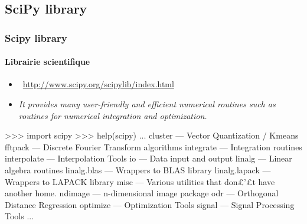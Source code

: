 \subsection{SciPy library}
\begin{frame}[fragile]
\frametitle{Scipy library}
\framesubtitle{Librairie scientifique}
\begin{itemize}
 \item {} \, \url{http://www.scipy.org/scipylib/index.html}
 \item \emph{It provides many user-friendly and efficient numerical routines such as routines for numerical integration and optimization.}
\end{itemize}
\begin{pythonConsole}
>>> import scipy
>>> help(scipy)
	...
     cluster                      --- Vector Quantization / Kmeans
     fftpack                      --- Discrete Fourier Transform algorithms
     integrate                    --- Integration routines
     interpolate                  --- Interpolation Tools
     io                           --- Data input and output
     linalg                       --- Linear algebra routines
     linalg.blas                  --- Wrappers to BLAS library
     linalg.lapack                --- Wrappers to LAPACK library
     misc                         --- Various utilities that don£'£t have
                                      another home.
     ndimage                      --- n-dimensional image package
     odr                          --- Orthogonal Distance Regression
     optimize                     --- Optimization Tools
     signal                       --- Signal Processing Tools
    ...
\end{pythonConsole}
\end{frame}
